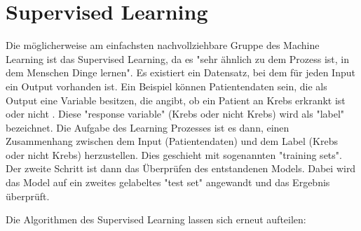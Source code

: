 \section{Supervised Learning}\label{subsec:sl}
Die möglicherweise am einfachsten nachvollziehbare Gruppe des Machine Learning ist das Supervised Learning, da es "sehr ähnlich zu dem Prozess ist, in dem Menschen Dinge lernen"\citep[S.~13; eigene Übersetzung]{kim_matlab_2017}. Es existiert ein Datensatz, bei dem für jeden Input ein Output vorhanden ist. Ein Beispiel können Patientendaten sein, die als Output eine Variable besitzen, die angibt, ob ein Patient an Krebs erkrankt ist oder nicht \citep[S.~222]{ramasubramanian_machine_2017}. Diese "response variable" (Krebs oder nicht Krebs) wird als "label"\citep[S.~222]{ramasubramanian_machine_2017} bezeichnet. Die Aufgabe des Learning Prozesses ist es dann, einen Zusammenhang zwischen dem Input (Patientendaten) und dem Label (Krebs oder nicht Krebs) herzustellen. Dies geschieht mit sogenannten "training sets"\citep[S.~5]{paluszek_matlab_2017}. Der zweite Schritt ist dann das Überprüfen des entstandenen Models. Dabei wird das Model auf ein zweites gelabeltes "test set"\citep[S.~5]{paluszek_matlab_2017} angewandt und das Ergebnis überprüft.\par
Die Algorithmen des Supervised Learning lassen sich erneut aufteilen:

